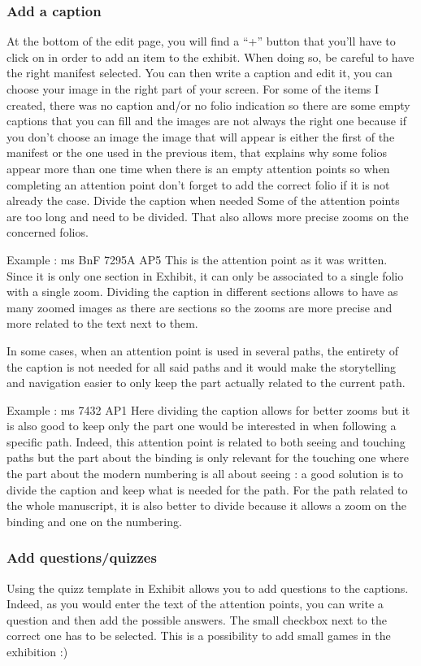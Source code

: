     \subsubsection{Add a caption}
    At the bottom of the edit page, you will find a “+” button that you’ll have to click on in order to add an item to the exhibit. When doing so, be careful to have the right manifest selected. You can then write a caption and edit it, you can choose your image in the right part of your screen. 
    For some of the items I created, there was no caption and/or no folio indication so there are some empty captions that you can fill and the images are not always the right one because if you don’t choose an image the image that will appear is either the first of the manifest or the one used in the previous item, that explains why some folios appear more than one time when there is an empty attention points so when completing an attention point don’t forget to add the correct folio if it is not already the case. 
    Divide the caption when needed
    Some of the attention points are too long and need to be divided. That also allows more precise zooms on the concerned folios.

    Example : ms BnF 7295A AP5
    This is the attention point as it was written. Since it is only one section in Exhibit, it can only be associated to a single folio with a single zoom. Dividing the caption in different sections allows to have as many zoomed images as there are sections so the zooms are more precise and more related to the text next to them. 

    In some cases, when an attention point is used in several paths, the entirety of the caption is not needed for all said paths and it would make the storytelling and navigation easier to only keep the part actually related to the current path.  

    Example : ms 7432 AP1
    Here dividing the caption allows for better zooms but it is also good to keep only the part one would be interested in when following a specific path. Indeed, this attention point is related to both seeing and touching paths but the part about the binding is only relevant for the touching one where the part about the modern numbering is all about seeing : a good solution is to divide the caption and keep what is needed for the path. For the path related to the whole manuscript, it is also better to divide because it allows a zoom on the binding and one on the numbering. 


    \subsubsection{Add questions/quizzes}
    Using the quizz template in Exhibit allows you to add questions to the captions. Indeed, as you would enter the text of the attention points, you can write a question and then add the possible answers. The small checkbox next to the correct one has to be selected. This is a possibility to add small games in the exhibition :)

